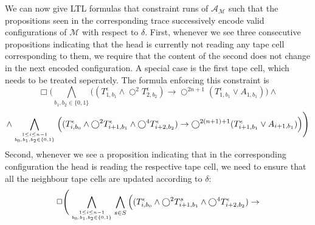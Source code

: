 \documentclass{llncs}
\newcommand{\automaton}{\ensuremath{\mathcal{A}}}
\newcommand{\tm}{\ensuremath{\mathcal{M}}}
\begin{document}
We can now give LTL formulas that constraint runs of $\automaton_\tm$
such that the propositions seen in the corresponding trace
successively encode valid configurations of $\tm$ with respect to
$\delta$.  First, whenever we see three consecutive propositions
indicating that the head is currently not reading any tape cell
corresponding to them, we require that the content of the second does
not change in the next encoded configuration. A special case is the
first tape cell, which needs to be treated seperately. The formula
enforcing this constraint is
\begin{equation*}
   \Box\Bigg(
     \bigwedge_{b_1,b_2\in \{0,1\}} \Big(
  (T_{1,b_1}^\epsilon \wedge \bigcirc^2 T_{2,b_2}^\epsilon) \rightarrow
  \bigcirc^{2n+1} (T_{1,b_1}^\epsilon \vee A_{1,b_1})
  \Big)\wedge
\end{equation*}
\begin{equation*}
  \wedge\bigwedge_{1\le i\le n-1\atop b_0,b_1,b_2\in \{0,1\}}
  \Big( (T_{i,b_0}^\epsilon \wedge \bigcirc^{2}T_{i+1,b_1}^\epsilon \wedge
  \bigcirc^{4}T_{i+2,b_2}^\epsilon) \rightarrow
  \bigcirc^{2(n+1)+1}(T_{i+1,b_1}^\epsilon\vee A_{i+1,b_1}) \Big)\Bigg)
\end{equation*}
Second, whenever we see a proposition indicating that in the
corresponding configuration the head is reading the respective
tape cell, we need to ensure that all the neighbour tape
cells are updated according to $\delta$:
\begin{equation*}
  \Box\Bigg(\bigwedge_{1\le i\le n-1\atop b_0,b_1,b_2\in \{0,1\}}
  \bigwedge_{s\in S} \Big( (T_{i,b_0}^\epsilon \wedge
  \bigcirc^{2}T_{i+1,b_1}^s \wedge \bigcirc^{4}T_{i+2,b_2}^\epsilon)
  \rightarrow
\end{equation*}
\end{document}

